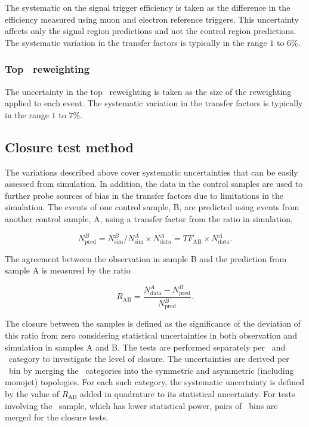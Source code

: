 The systematic on the signal trigger efficiency is taken as the difference in the 
efficiency measured using muon and electron reference triggers. 
This uncertainty affects only the signal region predictions
and not the control region predictions. The systematic variation in the transfer factors is 
typically in the range $1$ to $6\%$.

\subsubsection{Top \pt~reweighting}
The uncertainty in the top \pt~reweighting is taken as the size of the reweighting
applied to each event. The systematic variation in the transfer factors is typically in the range
$1$ to $7\%$.

\subsection{Closure test method}
\label{sec:closure-tests}
The variations described above cover systematic uncertainties that can be easily assessed 
from simulation. In addition, the data in the control samples are used to
further probe sources of bias in the transfer factors due to limitations in the simulation.
The events of one control sample, B, are predicted using events from another control sample, A,
using a transfer factor from the ratio in simulation, 

\begin{equation}
\label{equ:abPred}
N^{B}_{\text{pred}} = N^{B}_{\text{sim}}/N^{A}_{\text{sim}} \times N^{A}_{\text{data}} = TF_{\text{AB}} \times N^{A}_{\text{data}}.
\end{equation}

The agreement between the observation in sample B and the prediction from sample A is measured by the ratio

\begin{equation}
R_{\text{AB}} = \frac{N^{A}_{\text{data}}-N^{B}_{\text{pred}}}{N^{B}_{\text{pred}}}.
\end{equation}


The closure between the samples is defined as the significance of the deviation of this ratio from zero 
considering statistical uncertainties in both observation and simulation in samples A and B.
The tests are performed separately per \njet~and \scalht~category to investigate the level of closure. 
The uncertainties are derived per \scalht~bin by merging the \njet~categories into 
the symmetric and asymmetric (including monojet) topologies. For each such category, the systematic
uncertainty is defined by the value of $R_{\text{AB}}$ added in quadrature to its statistical uncertainty.
For tests involving the \mmj~sample, which has lower statistical power, pairs of \scalht~bins 
are merged for the closure tests. 

